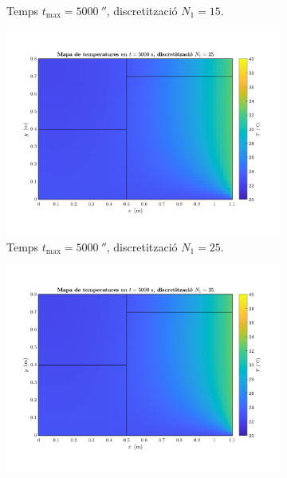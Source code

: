 \begin{figure}[ht]
\begin{subfigure}{.5\textwidth}
		\vspace{-15pt}
		\caption{Temps $t_\text{max} = 5000 \ \second$, discretització $N_1 = 15$.}
		\label{fig:malla_2}
	\end{subfigure}
	\begin{subfigure}{.5\textwidth}
		\centering
		\includegraphics[width=.95\linewidth]{imagenes/04_analisi_influencia_dades_numeriques/malla/malla_3.pdf}
		\vspace{-15pt}
		\caption{Temps $t_\text{max} = 5000 \ \second$, discretització $N_1 = 25$.}
		\label{fig:malla_3}
	\end{subfigure}%
	\begin{subfigure}{.5\textwidth}
		\centering
		\includegraphics[width=.95\linewidth]{imagenes/04_analisi_influencia_dades_numeriques/malla/malla_4.pdf}
		\vspace{-15pt}

\end{subfigure}
\end{figure}
